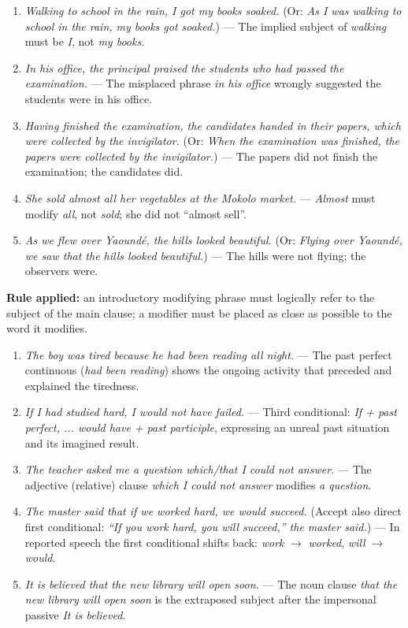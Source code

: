 \documentclass[11pt]{article}
\begin{document}
\begin{corrige}
\begin{enumerate}
\item \emph{Walking to school in the rain, I got my books soaked.} (Or: \emph{As I was walking to school in the rain, my books got soaked.}) — The implied subject of \emph{walking} must be \emph{I}, not \emph{my books}.
\item \emph{In his office, the principal praised the students who had passed the examination.} — The misplaced phrase \emph{in his office} wrongly suggested the students were in his office.
\item \emph{Having finished the examination, the candidates handed in their papers, which were collected by the invigilator.} (Or: \emph{When the examination was finished, the papers were collected by the invigilator.}) — The papers did not finish the examination; the candidates did.
\item \emph{She sold almost all her vegetables at the Mokolo market.} — \emph{Almost} must modify \emph{all}, not \emph{sold}; she did not ``almost sell''.
\item \emph{As we flew over Yaoundé, the hills looked beautiful.} (Or: \emph{Flying over Yaoundé, we saw that the hills looked beautiful.}) — The hills were not flying; the observers were.
\end{enumerate}
\textbf{Rule applied:} an introductory modifying phrase must logically refer to the subject of the main clause; a modifier must be placed as close as possible to the word it modifies.
\end{corrige}

\begin{corrige}
\begin{enumerate}
\item \emph{The boy was tired because he had been reading all night.} — The past perfect continuous (\emph{had been reading}) shows the ongoing activity that preceded and explained the tiredness.
\item \emph{If I had studied hard, I would not have failed.} — Third conditional: \emph{If + past perfect, ... would have + past participle}, expressing an unreal past situation and its imagined result.
\item \emph{The teacher asked me a question which/that I could not answer.} — The adjective (relative) clause \emph{which I could not answer} modifies \emph{a question}.
\item \emph{The master said that if we worked hard, we would succeed.} (Accept also direct first conditional: \emph{``If you work hard, you will succeed,'' the master said.}) — In reported speech the first conditional shifts back: \emph{work} $\rightarrow$ \emph{worked}, \emph{will} $\rightarrow$ \emph{would}.
\item \emph{It is believed that the new library will open soon.} — The noun clause \emph{that the new library will open soon} is the extraposed subject after the impersonal passive \emph{It is believed}.
\end{enumerate}
\end{corrige}
\end{document}
